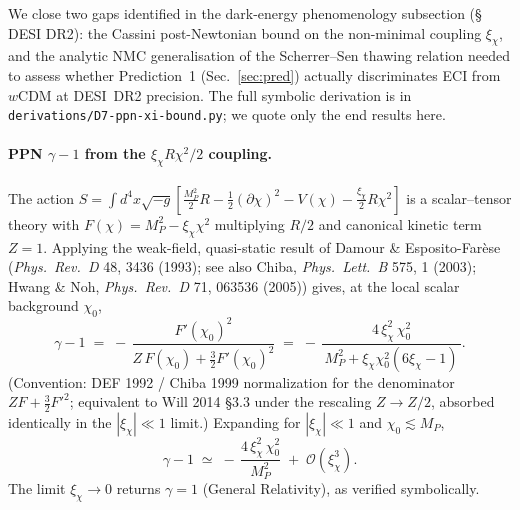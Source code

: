 \documentclass[epjc3,twocolumn]{svjour3}
\begin{document}
We close two gaps identified in the dark-energy phenomenology subsection (\S\,DESI DR2): the Cassini
post-Newtonian bound on the non-minimal coupling $\xi_\chi$, and the analytic NMC generalisation
of the Scherrer--Sen thawing relation needed to assess whether Prediction~1
(Sec.~\ref{sec:pred}) actually discriminates ECI from \(w\)CDM at DESI~DR2 precision.
The full symbolic derivation is in \texttt{derivations/D7-ppn-xi-bound.py}; we quote only the
end results here.

\paragraph{PPN $\gamma-1$ from the $\xi_\chi R\chi^2/2$ coupling.}
The action  $S=\int d^4x\sqrt{-g}\left[\tfrac{M_P^2}{2}R-\tfrac12(\partial\chi)^2-V(\chi)
-\tfrac{\xi_\chi}{2} R\chi^2\right]$ is a scalar--tensor theory with
$F(\chi)=M_P^2-\xi_\chi\chi^2$ multiplying $R/2$ and canonical kinetic term $Z=1$.
Applying the weak-field, quasi-static result of Damour \& Esposito-Far\`ese
(\emph{Phys.\ Rev.\ D} 48, 3436 (1993); see also Chiba, \emph{Phys.\ Lett.\ B} 575, 1 (2003);
Hwang \& Noh, \emph{Phys.\ Rev.\ D} 71, 063536 (2005)) gives, at the local scalar background
$\chi_0$,
\begin{equation}
  \gamma-1 \;=\; -\,\frac{F'(\chi_0)^2}{Z\,F(\chi_0)+\tfrac{3}{2}F'(\chi_0)^2}
           \;=\; -\,\frac{4\,\xi_\chi^{2}\,\chi_0^{2}}
                          {\,M_P^{2}+\xi_\chi\chi_0^{2}(6\xi_\chi-1)\,}.
  \label{eq:gamma_PPN_full}
\end{equation}
(Convention: DEF 1992 / Chiba 1999 normalization for the denominator
$Z F + \tfrac{3}{2}F'^{2}$; equivalent to Will 2014 \S3.3 under
the rescaling $Z\to Z/2$, absorbed identically in the $|\xi_\chi|\ll 1$ limit.)
Expanding for $|\xi_\chi|\ll 1$ and $\chi_0\lesssim M_P$,
\begin{equation}
  \boxed{\;\gamma-1 \;\simeq\; -\,\frac{4\,\xi_\chi^{2}\,\chi_0^{2}}{M_P^{2}}
                              \;+\;\mathcal{O}(\xi_\chi^{3}).\;}
  \label{eq:gamma_PPN_lead}
\end{equation}
The limit $\xi_\chi\to 0$ returns $\gamma=1$ (General Relativity), as verified symbolically.
\end{document}
